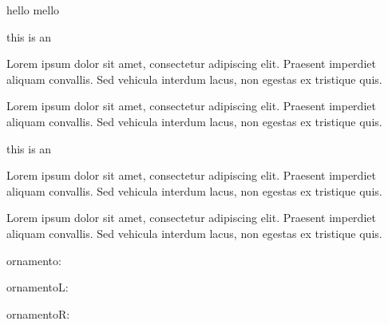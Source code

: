 \documentclass[a4paper]{scrartcl}
\begin{document}
hello mello 



this is an 


Lorem ipsum dolor sit amet, consectetur adipiscing elit. Praesent imperdiet aliquam convallis. Sed vehicula interdum lacus, non egestas ex tristique quis.


Lorem ipsum dolor sit amet, consectetur adipiscing elit. Praesent imperdiet aliquam convallis. Sed vehicula interdum lacus, non egestas ex tristique quis.


this is an 


Lorem ipsum dolor sit amet, consectetur adipiscing elit. Praesent imperdiet aliquam convallis. Sed vehicula interdum lacus, non egestas ex tristique quis.




Lorem ipsum dolor sit amet, consectetur adipiscing elit. Praesent imperdiet aliquam convallis. Sed vehicula interdum lacus, non egestas ex tristique quis.

ornamento:

\ornamento

ornamentoL:

\ornamentoLD

ornamentoR:

\ornamentoRD
\end{document}
